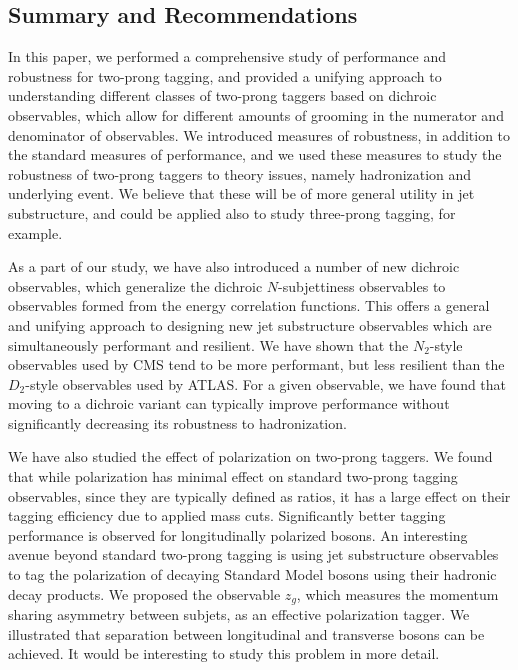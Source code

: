 \documentclass[11pt]{cernrep}
\begin{document}
\subsection{Summary and Recommendations}\label{jetsub_2prong_sec:conc}

In this paper, we performed a comprehensive study of performance and robustness for two-prong tagging, and provided a unifying approach to understanding different classes of two-prong taggers based on dichroic observables, which allow for different amounts of grooming in the numerator and denominator of observables.
%
We introduced measures of robustness, in addition to the standard measures of performance, and we used these measures to study the robustness of two-prong taggers to theory issues, namely hadronization and underlying event.
%
We believe that these will be of more general utility in jet substructure, and could be applied also to study three-prong tagging, for example.

As a part of our study, we have also introduced a number of new dichroic observables, which generalize the dichroic $N$-subjettiness observables to observables formed from the energy correlation functions.
%
This offers a general and unifying approach to designing new jet substructure observables which are simultaneously performant and resilient.
%
We have shown that the $N_2$-style observables used by CMS tend to be more performant, but less resilient than the $D_2$-style observables used by ATLAS.
%
For a given observable, we have found that moving to a dichroic variant can typically improve performance without significantly decreasing its robustness to hadronization.

We have also studied the effect of polarization on two-prong taggers.
%
We found that while polarization has minimal effect on standard two-prong tagging observables, since they are typically defined as ratios, it has a large effect on their tagging efficiency due to applied mass cuts.
%
Significantly better tagging performance is observed for longitudinally polarized bosons.
%
An interesting avenue beyond standard two-prong tagging is using jet substructure observables to tag the polarization of decaying Standard Model bosons using their hadronic decay products.
%
We proposed the observable $z_g$, which measures the momentum sharing asymmetry between subjets, as an effective polarization tagger.
%
We illustrated that separation between longitudinal and transverse bosons can be achieved.
%
It would be interesting to study this problem in more detail.
\end{document}
